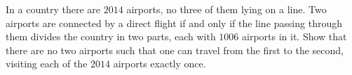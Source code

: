 In a country there are $2014$ airports, no three of them lying on a line. Two airports are connected by a direct flight if and only if the line passing through them divides the country in two parts, each with $1006$ airports in it. Show that there are no two airports such that one can travel from the first to the second, visiting each of the $2014$ airports exactly once.